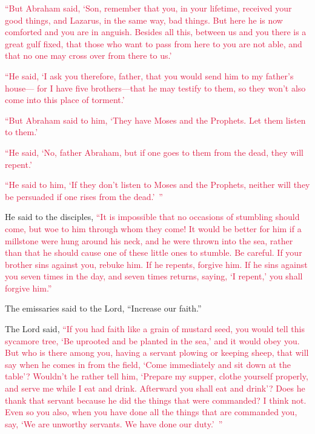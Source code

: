 \myverse{}\textcolor{crimson}{“But Abraham said, ‘Son, remember that you, in your lifetime,
	received your good things, and Lazarus, in the same way, bad things. But here he is now comforted and
	you are in anguish.
}
\myverse{}\textcolor{crimson}{Besides all this, between us and you there is a great gulf fixed, that
	those who want to pass from here to you are not able, and that no one may cross over from there to us.’}

\myverse{}\textcolor{crimson}{“He said, ‘I ask you therefore, father, that you would send
	him to my father’s house—}
\myverse{}\textcolor{crimson}{for I have five brothers—that he may testify to them, so they won’t also
	come into this place of torment.’}

\myverse{}\textcolor{crimson}{“But Abraham said to him, ‘They have Moses and the Prophets.
	Let them listen to them.’}

\myverse{}\textcolor{crimson}{“He said, ‘No, father Abraham, but if one goes to them from
	the dead, they will repent.’}

\myverse{}\textcolor{crimson}{“He said to him, ‘If they don’t listen to Moses and the Prophets,
	neither will they be persuaded if one rises from the dead.’ ”}


\mychapter{} \myverse*{}He said to the disciples,
\textcolor{crimson}{“It is impossible that no occasions of stumbling should come, but woe to him through whom they come!
}
\myverse{}\textcolor{crimson}{It would be better for him if a millstone were hung around his neck, and
	he were thrown into the sea, rather than that he should cause one of these little ones to stumble.
}
\myverse{}\textcolor{crimson}{Be careful. If your brother sins against you, rebuke him. If he repents,
	forgive him.
}
\myverse{}\textcolor{crimson}{If he sins against you seven times in the day, and seven times returns,
	saying, ‘I repent,’ you shall forgive him.”}

\myverse{}The emissaries said to the Lord, “Increase our faith.”

\myverse{}The Lord said, \textcolor{crimson}{“If you had faith like a grain of mustard seed, you would tell this sycamore tree, ‘Be uprooted and be planted in the sea,’ and it would obey you.} \myverse{}\textcolor{crimson}{But who is there among you, having a servant plowing or keeping sheep, that will say when he comes in from the field, ‘Come immediately and sit down at the table’?} \myverse{}\textcolor{crimson}{Wouldn’t he rather tell him, ‘Prepare my supper, clothe yourself properly, and serve me while I eat and drink. Afterward you shall eat and drink’?} \myverse{}\textcolor{crimson}{Does he thank that servant because he did the things that were commanded? I think not.} \myverse{}\textcolor{crimson}{Even so you also, when you have done all the things that are commanded you, say, ‘We are unworthy servants. We have done our duty.’ ”}

